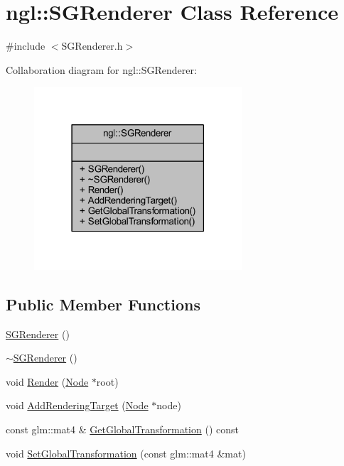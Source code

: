 \hypertarget{classngl_1_1_s_g_renderer}{}\section{ngl\+:\+:S\+G\+Renderer Class Reference}
\label{classngl_1_1_s_g_renderer}


{\ttfamily \#include $<$S\+G\+Renderer.\+h$>$}



Collaboration diagram for ngl\+:\+:S\+G\+Renderer\+:
\nopagebreak
\begin{figure}[H]
\begin{center}
\leavevmode
\includegraphics[width=219pt]{classngl_1_1_s_g_renderer__coll__graph}
\end{center}
\end{figure}
\subsection*{Public Member Functions}
\begin{DoxyCompactItemize}
\item 
\mbox{\hyperlink{classngl_1_1_s_g_renderer_a01d44354eea50048a01aac80dd6636bf}{S\+G\+Renderer}} ()
\item 
\mbox{\hyperlink{classngl_1_1_s_g_renderer_a1d31c78e2bd4af1ff98750ca514211c8}{$\sim$\+S\+G\+Renderer}} ()
\item 
void \mbox{\hyperlink{classngl_1_1_s_g_renderer_a608ef64bc93b33694b8650cb05a8a3b1}{Render}} (\mbox{\hyperlink{classngl_1_1_node}{Node}} $\ast$root)
\item 
void \mbox{\hyperlink{classngl_1_1_s_g_renderer_a7fb106fb357a004bec7d31a09a15662c}{Add\+Rendering\+Target}} (\mbox{\hyperlink{classngl_1_1_node}{Node}} $\ast$node)
\item 
const glm\+::mat4 \& \mbox{\hyperlink{classngl_1_1_s_g_renderer_a7ea21d48ea05c05c4e1cc2161bbaf5d4}{Get\+Global\+Transformation}} () const
\item 
void \mbox{\hyperlink{classngl_1_1_s_g_renderer_a611a1f8449c50468d4b06a22f2e484e6}{Set\+Global\+Transformation}} (const glm\+::mat4 \&mat)
\end{DoxyCompactItemize}


